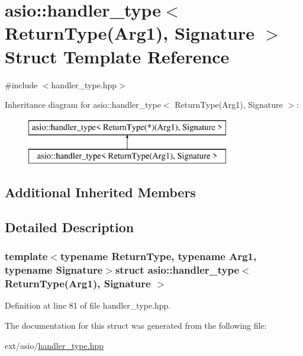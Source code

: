 \hypertarget{structasio_1_1handler__type_3_01_return_type_07_arg1_08_00_01_signature_01_4}{}\section{asio\+:\+:handler\+\_\+type$<$ Return\+Type(Arg1), Signature $>$ Struct Template Reference}
\label{structasio_1_1handler__type_3_01_return_type_07_arg1_08_00_01_signature_01_4}


{\ttfamily \#include $<$handler\+\_\+type.\+hpp$>$}

Inheritance diagram for asio\+:\+:handler\+\_\+type$<$ Return\+Type(Arg1), Signature $>$\+:\begin{figure}[H]
\begin{center}
\leavevmode
\includegraphics[height=2.000000cm]{structasio_1_1handler__type_3_01_return_type_07_arg1_08_00_01_signature_01_4}
\end{center}
\end{figure}
\subsection*{Additional Inherited Members}


\subsection{Detailed Description}
\subsubsection*{template$<$typename Return\+Type, typename Arg1, typename Signature$>$struct asio\+::handler\+\_\+type$<$ Return\+Type(\+Arg1), Signature $>$}



Definition at line 81 of file handler\+\_\+type.\+hpp.



The documentation for this struct was generated from the following file\+:\begin{DoxyCompactItemize}
\item 
ext/asio/\hyperlink{handler__type_8hpp}{handler\+\_\+type.\+hpp}\end{DoxyCompactItemize}
